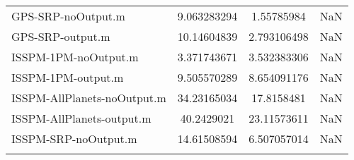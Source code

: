 \begin{table}[htbp!]
\begin{tabular}{lccc}
         GPS-SRP-noOutput.m & 9.063283294 & 1.55785984 & NaN \\
         GPS-SRP-output.m & 10.14604839 & 2.793106498 & NaN \\
         ISSPM-1PM-noOutput.m & 3.371743671 & 3.532383306 & NaN \\
         ISSPM-1PM-output.m & 9.505570289 & 8.654091176 & NaN \\
         ISSPM-AllPlanets-noOutput.m & 34.23165034 & 17.8158481 & NaN \\
         ISSPM-AllPlanets-output.m & 40.2429021 & 23.11573611 & NaN \\
         ISSPM-SRP-noOutput.m & 14.61508594 & 6.507057014 & NaN \\
      \hline\hline
      \label{Table: Performance1-1} 
\end{tabular}
\end{table}
